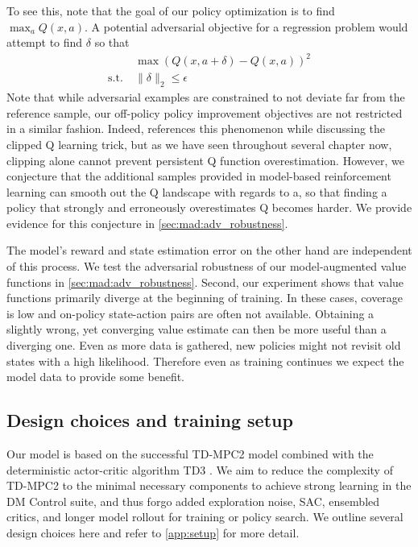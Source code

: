 To see this, note that the goal of our policy optimization is to find $\max_a Q(x,a)$. 
A potential adversarial objective for a regression problem would attempt to find $\delta$ so that 
\begin{align*}
    &\max (Q(x,a+\delta) - Q(x,a))^2\\
    \mathrm{s.t.}~&\|\delta\|_2 \leq \epsilon
\end{align*}
Note that while adversarial examples are constrained to not deviate far from the reference sample, our off-policy policy improvement objectives are not restricted in a similar fashion.
Indeed, \textcite{fujimoto2018addressing} references this phenomenon while discussing the clipped Q learning trick, but as we have seen throughout several chapter now, clipping alone cannot prevent persistent Q function overestimation.
However, we conjecture that the additional samples provided in model-based reinforcement learning can smooth out the Q landscape with regards to a, so that finding a policy that strongly and erroneously overestimates Q becomes harder.
We provide evidence for this conjecture in \autoref{sec:mad:adv_robustness}.

The model's reward and state estimation error on the other hand are independent of this process.
We test the adversarial robustness of our model-augmented value functions in \autoref{sec:mad:adv_robustness}.
Second, our experiment shows that value functions primarily diverge at the beginning of training.
In these cases, coverage is low and on-policy state-action pairs are often not available.
Obtaining a slightly wrong, yet converging value estimate can then be more useful than a diverging one. 
Even as more data is gathered, new policies might not revisit old states with a high likelihood.
Therefore even as training continues we expect the model data to provide some benefit.

\subsection{Design choices and training setup}
\label{sec:mad:method}

Our model is based on the successful TD-MPC2 model \parencite{hansen2024tdmpc} combined with the deterministic actor-critic algorithm TD3 \parencite{fujimoto2018addressing}.
We aim to reduce the complexity of TD-MPC2 to the minimal necessary components to achieve strong learning in the DM Control suite, and thus forgo added exploration noise, SAC, ensembled critics, and longer model rollout for training or policy search. We outline several design choices here and refer to \autoref{app:setup} for more detail.

